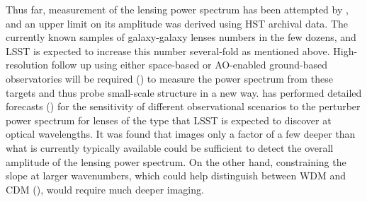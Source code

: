 Thus far, measurement of the lensing power spectrum has been attempted by \cite{Bayer:2018vhy}, and an upper limit on its amplitude was derived using HST archival data. The currently known samples of galaxy-galaxy lenses numbers in the few dozens, and LSST is expected to increase this number several-fold as mentioned above. High-resolution follow up using either space-based or AO-enabled ground-based observatories will be required () to measure the power spectrum from these targets and thus probe small-scale structure in a new way. \citet{Cyr-Racine:2018htu} has performed detailed forecasts () for the sensitivity of different observational scenarios to the perturber power spectrum for lenses of the type that LSST is expected to discover at optical wavelengths. It was found that images only a factor of a few deeper than what is currently typically available \citep[\eg, from the SLACS sample][]{Bolton2008} could be sufficient to detect the overall amplitude of the lensing power spectrum. On the other hand, constraining the slope at larger wavenumbers, which could help distinguish between WDM and CDM (), would require much deeper imaging.
